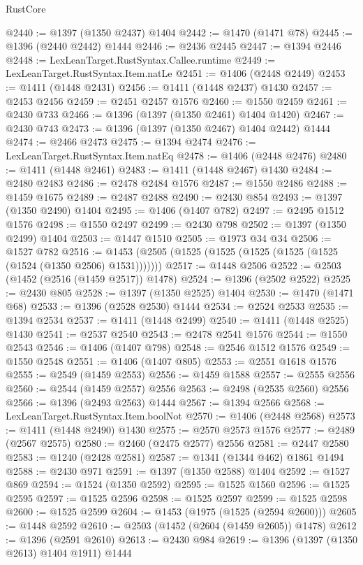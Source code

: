 \begin{lexlean}{RustCore}
\begin{coremodule}
{\begin{coremodule}
{{{{{{{{{{{{{{{{{{{{{{{{{{{{{{{{{{{{{{{{{{{{{@2440 := @1397 (@1350 @2437) @1404
@2442 := @1470 (@1471 @78)
@2445 := @1396 (@2440 @2442) @1444
@2446 := @2436 @2445
@2447 := @1394 @2446
@2448 := LexLeanTarget.RustSyntax.Callee.runtime
@2449 := LexLeanTarget.RustSyntax.Item.natLe
@2451 := @1406 (@2448 @2449)
@2453 := @1411 (@1448 @2431)
@2456 := @1411 (@1448 @2437) @1430
@2457 := @2453 @2456
@2459 := @2451 @2457 @1576
@2460 := @1550 @2459
@2461 := @2430 @733
@2466 := @1396 (@1397 (@1350 @2461) @1404 @1420)
@2467 := @2430 @743
@2473 := @1396 (@1397 (@1350 @2467) @1404 @2442) @1444
@2474 := @2466 @2473
@2475 := @1394 @2474
@2476 := LexLeanTarget.RustSyntax.Item.natEq
@2478 := @1406 (@2448 @2476)
@2480 := @1411 (@1448 @2461)
@2483 := @1411 (@1448 @2467) @1430
@2484 := @2480 @2483
@2486 := @2478 @2484 @1576
@2487 := @1550 @2486
@2488 := @1459 @1675
@2489 := @2487 @2488
@2490 := @2430 @854
@2493 := @1397 (@1350 @2490) @1404
@2495 := @1406 (@1407 @782)
@2497 := @2495 @1512 @1576
@2498 := @1550 @2497
@2499 := @2430 @798
@2502 := @1397 (@1350 @2499) @1404
@2503 := @1447 @1510
@2505 := @1973 @34 @34
@2506 := @1527 @782
@2516 := @1453 (@2505 (@1525 (@1525 (@1525 (@1525 (@1525 (@1524 (@1350 @2506) @1531)))))))
@2517 := @1448 @2506
@2522 := @2503 (@1452 (@2516 (@1459 @2517)) @1478)
@2524 := @1396 (@2502 @2522)
@2525 := @2430 @805
@2528 := @1397 (@1350 @2525) @1404
@2530 := @1470 (@1471 @68)
@2533 := @1396 (@2528 @2530) @1444
@2534 := @2524 @2533
@2535 := @1394 @2534
@2537 := @1411 (@1448 @2499)
@2540 := @1411 (@1448 @2525) @1430
@2541 := @2537 @2540
@2543 := @2478 @2541 @1576
@2544 := @1550 @2543
@2546 := @1406 (@1407 @798)
@2548 := @2546 @1512 @1576
@2549 := @1550 @2548
@2551 := @1406 (@1407 @805)
@2553 := @2551 @1618 @1576
@2555 := @2549 (@1459 @2553)
@2556 := @1459 @1588
@2557 := @2555 @2556
@2560 := @2544 (@1459 @2557) @2556
@2563 := @2498 (@2535 @2560) @2556
@2566 := @1396 (@2493 @2563) @1444
@2567 := @1394 @2566
@2568 := LexLeanTarget.RustSyntax.Item.boolNot
@2570 := @1406 (@2448 @2568)
@2573 := @1411 (@1448 @2490) @1430
@2575 := @2570 @2573 @1576
@2577 := @2489 (@2567 @2575)
@2580 := @2460 (@2475 @2577) @2556
@2581 := @2447 @2580
@2583 := @1240 (@2428 @2581)
@2587 := @1341 (@1344 @462) @1861 @1494
@2588 := @2430 @971
@2591 := @1397 (@1350 @2588) @1404
@2592 := @1527 @869
@2594 := @1524 (@1350 @2592)
@2595 := @1525 @1560
@2596 := @1525 @2595
@2597 := @1525 @2596
@2598 := @1525 @2597
@2599 := @1525 @2598
@2600 := @1525 @2599
@2604 := @1453 (@1975 (@1525 (@2594 @2600)))
@2605 := @1448 @2592
@2610 := @2503 (@1452 (@2604 (@1459 @2605)) @1478)
@2612 := @1396 (@2591 @2610)
@2613 := @2430 @984
@2619 := @1396 (@1397 (@1350 @2613) @1404 @1911) @1444
}}}}}}}}}}}}}}}}}}}}}}}}}}}}}}}}}}}}}}}}}}}}}
\end{coremodule}}
\end{coremodule}
\end{lexlean}
